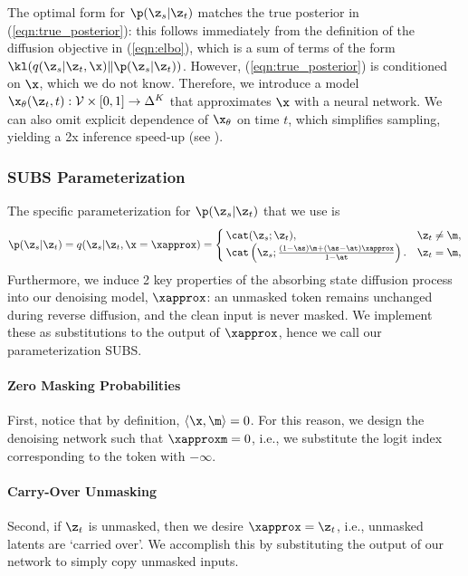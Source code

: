 \documentclass{article} %
\def\method{SUBS}
\def\onehotset{\mathcal{V}}
\begin{document}
The optimal form for $\p(\z_s | \z_t)$ matches the true posterior in (\ref{eqn:true_posterior}): this follows immediately from the definition of the diffusion objective in (\ref{eqn:elbo}), which is a sum of terms of the form $\kl(q(\z_{s} | \z_{t}, \x) \| \p(\z_{s} | \z_{t}))$. 
However, (\ref{eqn:true_posterior}) is conditioned on $\x$, which we do not know.
Therefore, we introduce a model $\x_\theta(\z_t, t): \onehotset \times [0, 1] \rightarrow \Delta^{K}$ that approximates $\x$ with a neural network.
We can also omit explicit dependence of $\x_\theta$ on time $t$, which simplifies sampling, yielding a 2x inference speed-up (see ).





\subsubsection{\method{} Parameterization}\label{subsec:subs}
The specific parameterization for $\p(\z_s | \z_t)$ that we use is
\begin{align}\label{eqn:approx_posterior}
    \p(\z_s | \z_t) =
    q(\z_s | \z_t, \x=\xapprox) =
    \begin{cases}
        \cat (\z_s; \z_t), & \z_t \neq \m, \\
        \cat \left( \z_s; \frac{
        (1 - \as)\m + (\as - \at)\xapprox}{1 - \at}\right). & \z_t=\m,
    \end{cases}
\end{align}
Furthermore, we induce 2 key properties of the absorbing state diffusion process into our denoising model, $\xapprox$: an unmasked token remains unchanged during reverse diffusion, and the clean input is never masked.
We implement these as substitutions to the output of $\xapprox$, hence we call our parameterization SUBS.
\paragraph{Zero Masking Probabilities}
First, notice that by definition, $\langle \x, \m \rangle = 0$.
For this reason, we design the denoising network such that  $\xapproxm = 0$, i.e., we substitute the logit index corresponding to the \mask token with $-\infty$.

\paragraph{Carry-Over Unmasking}
Second, if $\z_t$ is unmasked, then we desire $\xapprox = \z_t$, i.e., unmasked latents are `carried over'.
We accomplish this by substituting the output of our network to simply copy unmasked inputs. %
\end{document}
